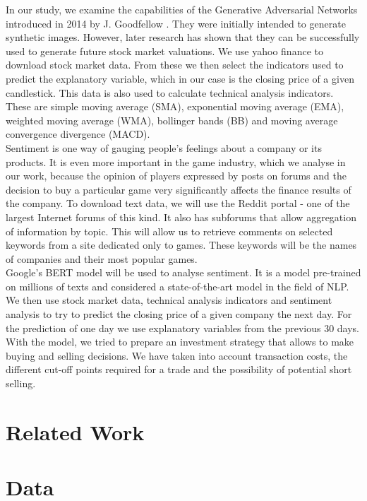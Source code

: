 \documentclass[11pt]{article} %
\begin{document}
In our study, we examine the capabilities of the Generative Adversarial Networks introduced in 2014 by J. Goodfellow \cite{gan1}. They were initially intended to generate synthetic images. However, later research has shown that they can be successfully used to generate future stock market valuations. We use yahoo finance to download stock market data. From these we then select the indicators used to predict the explanatory variable, which in our case is the closing price of a given candlestick. This data is also used to calculate technical analysis indicators. These are simple moving average (SMA), exponential moving average (EMA), weighted moving average (WMA), bollinger bands (BB) and moving average convergence divergence (MACD). \\

Sentiment is one way of gauging people's feelings about a company or its products. It is even more important in the game industry, which we analyse in our work, because the opinion of players expressed by posts on forums and the decision to buy a particular game very significantly affects the finance results of the company. To download text data, we will use the Reddit portal - one of the largest Internet forums of this kind. It also has subforums that allow aggregation of information by topic. This will allow us to retrieve comments on selected keywords from a site dedicated only to games. These keywords will be the names of companies and their most popular games. \\

Google's BERT model will be used to analyse sentiment. It is a model pre-trained on millions of texts and considered a state-of-the-art model in the field of NLP. 
We then use stock market data, technical analysis indicators and sentiment analysis to try to predict the closing price of a given company the next day. For the prediction of one day we use explanatory variables from the previous 30 days. With the model, we tried to prepare an investment strategy that allows to make buying and selling decisions. We have taken into account transaction costs, the different cut-off points required for a trade and the possibility of potential short selling. 

\section{Related Work}


\section{Data}
\end{document}
